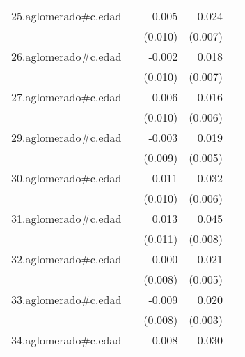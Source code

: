 {\begin{longtable}{l*{4}{D{.}{.}{-1}}}
\addlinespace
25.aglomerado#c.edad&                     &       0.005         &       0.024\sym{***}&                     \\
            &                     &     (0.010)         &     (0.007)         &                     \\
\addlinespace
26.aglomerado#c.edad&                     &      -0.002         &       0.018\sym{**} &                     \\
            &                     &     (0.010)         &     (0.007)         &                     \\
\addlinespace
27.aglomerado#c.edad&                     &       0.006         &       0.016\sym{**} &                     \\
            &                     &     (0.010)         &     (0.006)         &                     \\
\addlinespace
29.aglomerado#c.edad&                     &      -0.003         &       0.019\sym{***}&                     \\
            &                     &     (0.009)         &     (0.005)         &                     \\
\addlinespace
30.aglomerado#c.edad&                     &       0.011         &       0.032\sym{***}&                     \\
            &                     &     (0.010)         &     (0.006)         &                     \\
\addlinespace
31.aglomerado#c.edad&                     &       0.013         &       0.045\sym{***}&                     \\
            &                     &     (0.011)         &     (0.008)         &                     \\
\addlinespace
32.aglomerado#c.edad&                     &       0.000         &       0.021\sym{***}&                     \\
            &                     &     (0.008)         &     (0.005)         &                     \\
\addlinespace
33.aglomerado#c.edad&                     &      -0.009         &       0.020\sym{***}&                     \\
            &                     &     (0.008)         &     (0.003)         &                     \\
\addlinespace
34.aglomerado#c.edad&                     &       0.008         &       0.030\sym{***}&                     \\

\end{longtable}}
